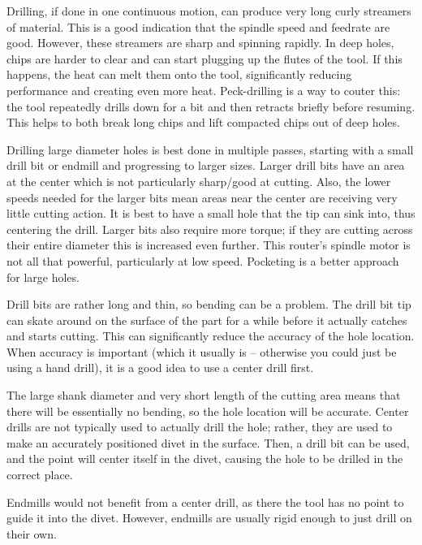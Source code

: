 \documentclass[a4paper,11pt]{article}
\begin{document}
Drilling, if done in one continuous motion, can produce very long curly streamers of material. This is a good indication that the spindle speed and feedrate are good. However, these streamers are sharp and spinning rapidly. In deep holes, chips are harder to clear and can start plugging up the flutes of the tool. If this happens, the heat can melt them onto the tool, significantly reducing performance and creating even more heat. Peck-drilling is a way to couter this: the tool repeatedly drills down for a bit and then retracts briefly before resuming. This helps to both break long chips and lift compacted chips out of deep holes.

Drilling large diameter holes is best done in multiple passes, starting with a small drill bit or endmill and progressing to larger sizes. Larger drill bits have an area at the center which is not particularly sharp/good at cutting. Also, the lower speeds needed for the larger bits mean areas near the center are receiving very little cutting action. It is best to have a small hole that the tip can sink into, thus centering the drill. Larger bits also require more torque; if they are cutting across their entire diameter this is increased even further. This router's spindle motor is not all that powerful, particularly at low speed. Pocketing is a better approach for large holes.

Drill bits are rather long and thin, so bending can be a problem. The drill bit tip can skate around on the surface of the part for a while before it actually catches and starts cutting. This can significantly reduce the accuracy of the hole location. When accuracy is important (which it usually is -- otherwise you could just be using a hand drill), it is a good idea to use a center drill first. 


The large shank diameter and very short length of the cutting area means that there will be essentially no bending, so the hole location will be accurate. Center drills are not typically used to actually drill the hole; rather, they are used to make an accurately positioned divet in the surface. Then, a drill bit can be used, and the point will center itself in the divet, causing the hole to be drilled in the correct place.

Endmills would not benefit from a center drill, as there the tool has no point to guide it into the divet. However, endmills are usually rigid enough to just drill on their own.
\end{document}
